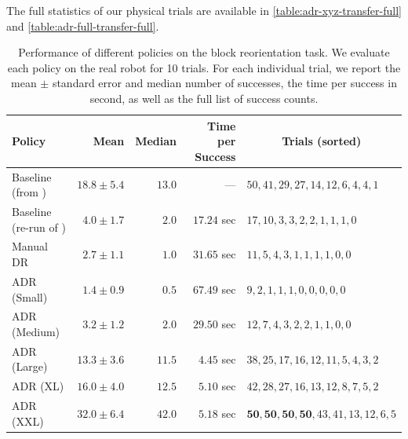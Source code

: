 The full statistics of our physical trials are available in \autoref{table:adr-xyz-transfer-full} and \autoref{table:adr-full-transfer-full}.

\begin{table}[h]
    \caption{Performance of different policies on the block reorientation task. We evaluate each policy on the real robot for 10 trials. For each individual trial, we report the mean $\pm$ standard error and median number of successes, the time per success in second, as well as the full list of success counts.}
    \label{table:adr-xyz-transfer-full}
    \centering
    \renewcommand{\arraystretch}{1.3}
    \begin{tabular}{l|rrr|l}
        \toprule
        \textbf{Policy}
        & \textbf{Mean}
        & \textbf{Median}
        & \textbf{Time per Success} 
        & \multicolumn{1}{c}{\textbf{Trials (sorted)}} \\

        \midrule
        
        Baseline (from \cite{openai2018learning})
        & $18.8 \pm 5.4$ & $13.0$ & --- 
        & $50,41,29,27,14,12,6,4,4,1$ \\
        
        Baseline (re-run of \cite{openai2018learning})
        & $4.0 \pm 1.7$ & $2.0$ & $17.24$ sec
        & $17,10,3,3,2,2,1,1,1,0$ \\

        \midrule

        Manual DR 
        & $2.7 \pm 1.1$ & $1.0$ & $31.65$ sec
        & $11,5,4,3,1,1,1,1,0,0$ \\
        ADR (Small)
        & $1.4 \pm 0.9$ & $0.5$ & $67.49$ sec
        & $9,2,1,1,1,0,0,0,0,0$ \\
        ADR (Medium)
        & $3.2 \pm 1.2$ & $2.0$ & $29.50$ sec
        & $12,7,4,3,2,2,1,1,0,0$ \\
        ADR (Large)
        & $13.3 \pm 3.6$ & $11.5$ & $4.45$ sec
        & $38,25,17,16,12,11,5,4,3,2$ \\
        
        \midrule
        
        ADR (XL)
        & $16.0 \pm 4.0$ & $12.5$ & $\mathbf{5.10}$ sec
        & $42,28,27,16,13,12,8,7,5,2$ \\
        ADR (XXL)
        & $\mathbf{32.0 \pm 6.4}$ & $\mathbf{42.0}$ & $5.18$ sec
        & $\mathbf{50},\mathbf{50},\mathbf{50},\mathbf{50},43,41,13,12,6,5$ \\

        \bottomrule
    \end{tabular}
\end{table}


